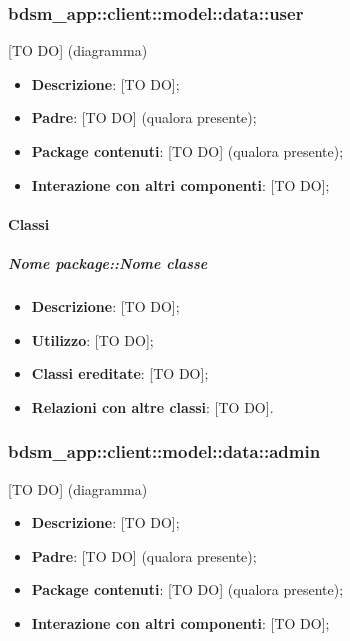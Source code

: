 	\subsubsection{bdsm\_app::client::model::data::user} %
	\label{ssub:bdsm_app_client_model_data_user}
	[TO DO] (diagramma) \newline \newline

	\begin{itemize}
		\item \textbf{Descrizione}: [TO DO];
		\item \textbf{Padre}: [TO DO] (qualora presente);
		\item \textbf{Package contenuti}: [TO DO] (qualora presente);
		\item \textbf{Interazione con altri componenti}: [TO DO];
	\end{itemize}

		\paragraph{Classi} %
			\subparagraph{Nome package::Nome classe} %
			\label{subp:subparagraph_name}
				\begin{itemize}
					\item \textbf{Descrizione}: [TO DO];
					\item \textbf{Utilizzo}: [TO DO];
					\item \textbf{Classi ereditate}: [TO DO];
					\item \textbf{Relazioni con altre classi}: [TO DO].
				\end{itemize}	

	\subsubsection{bdsm\_app::client::model::data::admin} %
	\label{ssub:bdsm_app_client_model_data_admin}
	[TO DO] (diagramma) \newline \newline

	\begin{itemize}
		\item \textbf{Descrizione}: [TO DO];
		\item \textbf{Padre}: [TO DO] (qualora presente);
		\item \textbf{Package contenuti}: [TO DO] (qualora presente);
		\item \textbf{Interazione con altri componenti}: [TO DO];
	\end{itemize}

